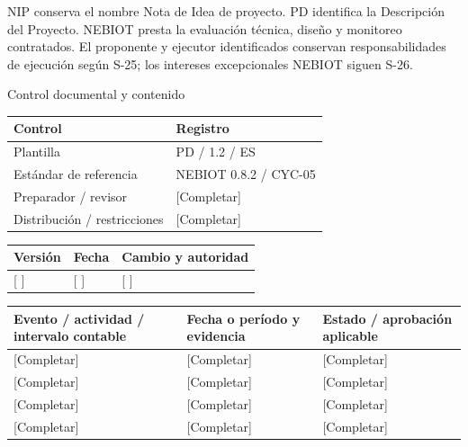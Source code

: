 \vspace{2mm}
NIP conserva el nombre Nota de Idea de proyecto. PD identifica la Descripción del Proyecto.
\vspace{2mm}
NEBIOT presta la evaluación técnica, diseño y monitoreo contratados. El proponente y ejecutor identificados conservan responsabilidades de ejecución según S-25; los intereses excepcionales NEBIOT siguen S-26.
\clearpage
{\fontsize{23}{27}\selectfont\color{NEBGreen}Control documental y contenido\par}
\vspace{3mm}
{\sffamily\fontsize{8.3}{10.3}\selectfont\begin{longtable}{@{}P{50.55mm} P{117.94mm}@{}}
\toprule
\textbf{Control} & \textbf{Registro}\\\midrule\endhead
\rule{0pt}{7.7mm}Plantilla & PD / 1.2 / ES\\\hline
\rule{0pt}{7.7mm}Estándar de referencia & NEBIOT 0.8.2 / CYC-05\\\hline
\rule{0pt}{7.7mm}Preparador / revisor & [Completar]\\\hline
\rule{0pt}{7.7mm}Distribución / restricciones & [Completar]\\\hline
\end{longtable}}
{\sffamily\fontsize{8.3}{10.3}\selectfont\begin{longtable}{@{}P{31.34mm} P{37.94mm} P{95.68mm}@{}}
\toprule
\textbf{Versión} & \textbf{Fecha} & \textbf{Cambio y autoridad}\\\midrule\endhead
\rule{0pt}{7.7mm}[ ] & [ ] & [ ]\\\hline
\end{longtable}}
{\sffamily\fontsize{9.5}{11.4}\selectfont\tableofcontents}
{\sffamily\fontsize{8.3}{10.3}\selectfont\begin{longtable}{@{}P{61.14mm} P{54.44mm} P{49.49mm}@{}}
\toprule
\textbf{Evento / actividad / intervalo contable} & \textbf{Fecha o período y evidencia} & \textbf{Estado / aprobación aplicable}\\\midrule\endhead
\rule{0pt}{7.7mm}[Completar] & [Completar] & [Completar]\\\hline
\rule{0pt}{7.7mm}[Completar] & [Completar] & [Completar]\\\hline
\rule{0pt}{7.7mm}[Completar] & [Completar] & [Completar]\\\hline
\rule{0pt}{7.7mm}[Completar] & [Completar] & [Completar]\\\hline
\end{longtable}}
